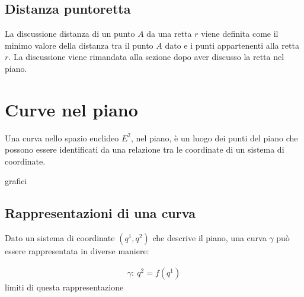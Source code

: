 \documentclass[letterpaper,10pt,italian]{jupyterBook}
\begin{document}
\subsection{Distanza punto\sphinxhyphen{}retta}
\label{\detokenize{ch/analytic_geometry/analytic_geometry_2d/points:distanza-punto-retta}}\label{\detokenize{ch/analytic_geometry/analytic_geometry_2d/points:geometry-analytic-2d-points-point-line-distance}}
\sphinxAtStartPar
La discussione distanza di un punto \(A\) da una retta \(r\) viene definita come il minimo valore della distanza tra il punto \(A\) dato e i punti appartenenti alla retta \(r\). La discussione viene rimandata alla sezione {\hyperref[\detokenize{ch/analytic_geometry/analytic_geometry_2d/lines:geometry-analytic-2d-lines-distance-point-line}]{}} dopo aver discusso la retta nel piano.



\sphinxstepscope


\section{Curve nel piano}
\label{\detokenize{ch/analytic_geometry/analytic_geometry_2d/curves:curve-nel-piano}}\label{\detokenize{ch/analytic_geometry/analytic_geometry_2d/curves:geometry-analytic-2d-curves}}\label{\detokenize{ch/analytic_geometry/analytic_geometry_2d/curves::doc}}
\sphinxAtStartPar
Una curva nello spazio euclideo \(E^2\), nel piano, è un luogo dei punti del piano che possono essere identificati da una relazione tra le coordinate di un sistema di coordinate.

\sphinxAtStartPar
{}  grafici




\subsection{Rappresentazioni di una curva}
\label{\detokenize{ch/analytic_geometry/analytic_geometry_2d/curves:rappresentazioni-di-una-curva}}
\sphinxAtStartPar
Dato un sistema di coordinate \((q^1, q^2)\) che descrive il piano, una curva \(\gamma\) può essere rappresentata in diverse maniere:

\sphinxAtStartPar
{}
\begin{equation*}
\begin{split}\gamma: \ q^2 = f(q^1)\end{split}
\end{equation*}
\sphinxAtStartPar
{} limiti di questa rappresentazione
\end{document}

